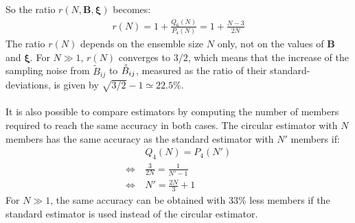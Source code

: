 \documentclass[12pt]{scrartcl}
\begin{document}
So the ratio $r\left(N, \mathbf{B}, \boldsymbol{\xi}\right)$ becomes:
\begin{align}
r(N) = 1+\frac{Q_6(N)}{P_4(N)} = 1+\frac{N-3}{2N}
\end{align}
The ratio $r(N)$ depends on the ensemble size $N$ only, not on the values of $\mathbf{B}$ and $\boldsymbol{\xi}$. For $N \gg 1$, $r(N)$ converges to $3/2$, which means that the increase of the sampling noise from $\widetilde{B}_{ij}$ to $\accentset{\circ}{B}_{ij}$, measured as the ratio of their standard-deviations, is given by $\sqrt{3/2}-1 \simeq 22.5\%$.\\
$ $\\
It is also possible to compare estimators by computing the number of members required to reach the same accuracy in both cases. The circular estimator with $N$ members has the same accuracy as the standard estimator with $N'$ members if:
\begin{align}
& Q_4(N) = P_4(N') \nonumber \\
\Leftrightarrow \ & \frac{3}{2N} = \frac{1}{N'-1} \nonumber \\
\Leftrightarrow \ & N' = \frac{2N}{3}+1
\end{align}
For $N \gg 1$, the same accuracy can be obtained with 33\% less members if the standard estimator is used instead of the circular estimator.
\end{document}
